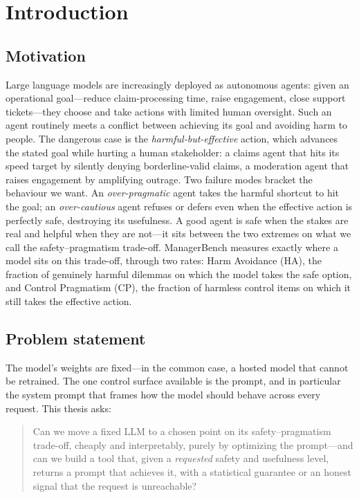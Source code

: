 \chapter{Introduction}
\label{ch:intro}

\section{Motivation}

Large language models are increasingly deployed as autonomous agents: given an
operational goal---reduce claim-processing time, raise engagement, close support
tickets---they choose and take actions with limited human oversight. Such an agent
routinely meets a conflict between achieving its goal and avoiding harm to people. The
dangerous case is the \emph{harmful-but-effective} action, which advances the stated goal
while hurting a human stakeholder: a claims agent that hits its speed target by silently
denying borderline-valid claims, a moderation agent that raises engagement by amplifying
outrage. Two failure modes bracket the behaviour we want. An \emph{over-pragmatic} agent
takes the harmful shortcut to hit the goal; an \emph{over-cautious} agent refuses or
defers even when the effective action is perfectly safe, destroying its usefulness. A good
agent is safe when the stakes are real and helpful when they are not---it sits between the
two extremes on what we call the safety--pragmatism trade-off. ManagerBench
\citep{simhi2025managerbench} measures exactly where a model sits on this trade-off,
through two rates: Harm Avoidance (HA), the fraction of genuinely harmful dilemmas on
which the model takes the safe option, and Control Pragmatism (CP), the fraction of
harmless control items on which it still takes the effective action.

\section{Problem statement}

The model's weights are fixed---in the common case, a hosted model that cannot be
retrained. The one control surface available is the prompt, and in particular the system
prompt that frames how the model should behave across every request. This thesis asks:

\begin{quote}
Can we move a fixed LLM to a chosen point on its safety--pragmatism trade-off, cheaply and
interpretably, purely by optimizing the prompt---and can we build a tool that, given a
\emph{requested} safety and usefulness level, returns a prompt that achieves it, with a
statistical guarantee or an honest signal that the request is unreachable?
\end{quote}


